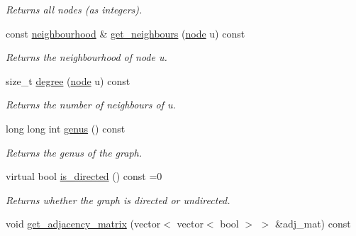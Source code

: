 \begin{DoxyCompactItemize}
\begin{DoxyCompactList}\small\item\em Returns all nodes (as integers). \end{DoxyCompactList}\item 
const \hyperlink{namespacelgraph_1_1utils_a0f2ef47028a466d26841709e705390ac}{neighbourhood} \& \hyperlink{classlgraph_1_1utils_1_1xxgraph_a2c5332c4663c2d52828893f095a68202}{get\-\_\-neighbours} (\hyperlink{namespacelgraph_1_1utils_a7bd66ede3805ef121bc2835bd48de0cf}{node} u) const 
\begin{DoxyCompactList}\small\item\em Returns the neighbourhood of node u. \end{DoxyCompactList}\item 
size\-\_\-t \hyperlink{classlgraph_1_1utils_1_1xxgraph_af588aa4c68004a31aa143024cdb6dcc9}{degree} (\hyperlink{namespacelgraph_1_1utils_a7bd66ede3805ef121bc2835bd48de0cf}{node} u) const 
\begin{DoxyCompactList}\small\item\em Returns the number of neighbours of u. \end{DoxyCompactList}\item 
long long int \hyperlink{classlgraph_1_1utils_1_1xxgraph_ade9c0fcadaa904181d2ea3031488c2e3}{genus} () const 
\begin{DoxyCompactList}\small\item\em Returns the genus of the graph. \end{DoxyCompactList}\item 
virtual bool \hyperlink{classlgraph_1_1utils_1_1xxgraph_a154376b6e55c4654622eb17ce738b5bb}{is\-\_\-directed} () const =0
\begin{DoxyCompactList}\small\item\em Returns whether the graph is directed or undirected. \end{DoxyCompactList}\item 
\hypertarget{classlgraph_1_1utils_1_1xxgraph_a401454762f6b4b69f13ab0a10729c457}{void \hyperlink{classlgraph_1_1utils_1_1xxgraph_a401454762f6b4b69f13ab0a10729c457}{get\-\_\-adjacency\-\_\-matrix} (vector$<$ vector$<$ bool $>$ $>$ \&adj\-\_\-mat) const }\label{classlgraph_1_1utils_1_1xxgraph_a401454762f6b4b69f13ab0a10729c457}


\end{DoxyCompactItemize}
